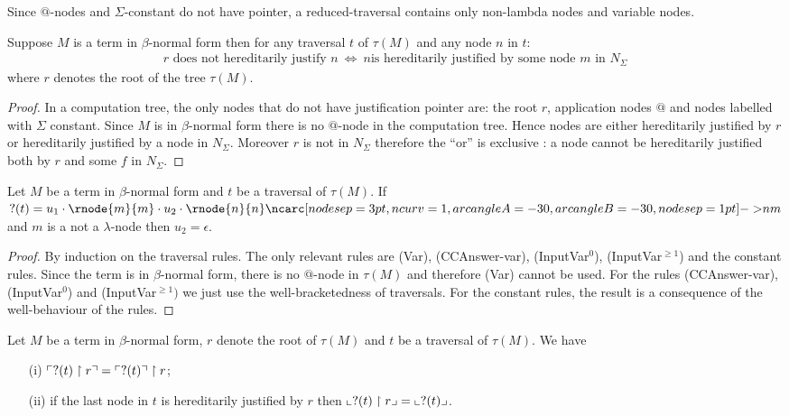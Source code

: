 Since $@$-nodes and $\Sigma$-constant do not have pointer, a reduced-traversal contains only
non-lambda nodes and variable nodes.


\begin{property}
\label{proper:betaeta_trav}
Suppose $M$ is a term in $\beta$-normal form then
for any traversal $t$ of $\tau(M)$ and any node $n$ in $t$:
\begin{eqnarray*}
r \mbox{ does not hereditarily justify } n  \  \iff \   n \mbox{
is hereditarily justified by some node $m$ in } N_\Sigma
\end{eqnarray*}
where $r$ denotes the root of the tree $\tau(M)$.
\end{property}
\begin{proof}
In a computation tree, the only nodes that do not have justification pointer are:
the root $r$, application nodes $@$ and nodes labelled with $\Sigma$ constant.
Since $M$ is in $\beta$-normal form there is no $@$-node in the computation tree.
Hence nodes are either hereditarily justified by $r$ or
hereditarily justified  by a node in $N_\Sigma$. Moreover $r$ is not in
$N_\Sigma$ therefore the ``or'' is exclusive : a node cannot be hereditarily justified both by $r$ and some $f$ in $N_\Sigma$.
\end{proof}


\begin{lem}
\label{lem:var_followedby_child}
Let $M$ be a term in $\beta$-normal form and $t$ be a traversal of $\tau(M)$.
If $?(t) = u_1 \cdot \rnode{m}{m} \cdot u_2 \cdot \rnode{n}{n} \bkptra[nodesep=1pt]{30}{n}{m}$ and $m$ is a not a $\lambda$-node then $u_2 = \epsilon$.
\end{lem}
\begin{proof}
By induction on the traversal rules. The only relevant rules are (Var), (CCAnswer-var), (InputVar$^0$), (InputVar$^{\geq 1}$)
and the constant rules.
Since the term is in $\beta$-normal form, there is no $@$-node in $\tau(M)$ and therefore (Var) cannot be used.
For the rules (CCAnswer-var), (InputVar$^0$) and (InputVar$^{\geq 1})$ we just use the well-bracketedness of traversals.
For the constant rules, the result is a consequence of the well-behaviour of the rules.
\end{proof}

\begin{lem}
\label{lem:redtrav_trav} Let $M$ be a term in $\beta$-normal form,
$r$ denote the root of $\tau(M)$ and $t$ be a traversal of $\tau(M)$. We have
\begin{itemize}
\item[(i)] $ \ulcorner ?(t) \upharpoonright  r  \urcorner = \ulcorner ?(t) \urcorner \upharpoonright r$;
\item[(ii)] if the last node in $t$ is hereditarily justified by $r$ then $ \llcorner ?(t) \upharpoonright r  \lrcorner = \llcorner ?(t) \lrcorner$.
\end{itemize}
\end{lem}


